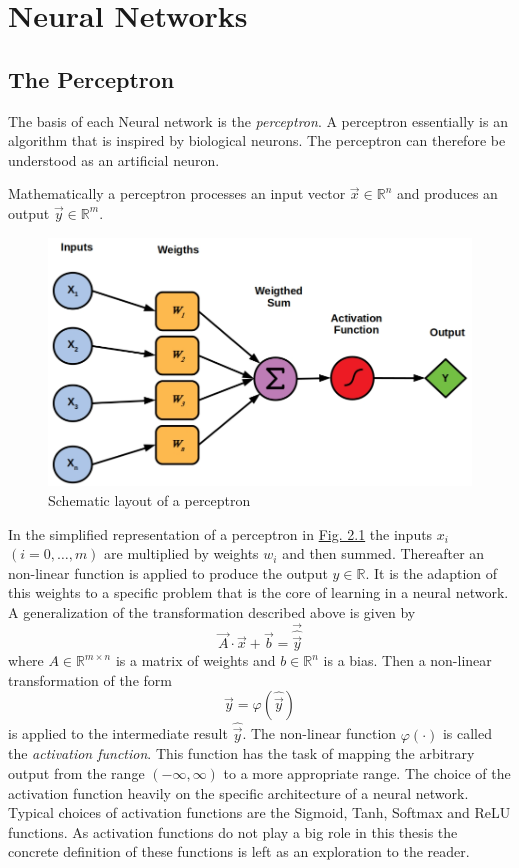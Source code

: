 \section{Neural Networks}
\subsection{The Perceptron}
The basis of each Neural network is the \textit{perceptron}. A perceptron essentially is an algorithm that is inspired by biological neurons. The perceptron can therefore be understood as an artificial neuron.

Mathematically a perceptron processes an input vector $\vec{x}\in\mathbb{R}^n$ and produces an output $\vec{y}\in\mathbb{R}^m$. 
%
\begin{figure} \label{fig:2.1}
    \centering
    \includegraphics[width=.5\textwidth]{Chapters/figures/perceptron.PNG}
    \caption{Schematic layout of a perceptron}
\end{figure}
%
In the simplified representation of a perceptron in \hyperref[fig:2.1]{Fig. 2.1} the inputs $x_i$ $ (i=0,\dots,m)$ are multiplied by weights $w_i$ and then summed. Thereafter an non-linear function is applied to produce the output $y\in\mathbb{R}$. It is the adaption of this weights to a specific problem that is the core of learning in a neural network. A generalization of the transformation described above is given by
%
\begin{equation} \label{equ:2.1}
    \vec{A}\cdot\vec{x}+\vec{b}=\vec{\hat{\vec{y}}}
\end{equation}
%
where $A\in\mathbb{R}^{m\times n}$ is a matrix of weights and $b\in\mathbb{R}^n$ is a bias. Then a non-linear transformation of the form
%
\begin{equation} \label{equ:2.2}
    \vec{y}=\varphi(\hat{\vec{y}})
\end{equation}
%
is applied to the intermediate result $\hat{\vec{y}}$. The non-linear function $\varphi(\cdot)$ is called the \textit{activation function}. This function has the task of mapping the arbitrary output from the range $(-\infty,\infty)$ to a more appropriate range. The choice of the activation function heavily on the specific architecture of a neural network. Typical choices of activation functions are the Sigmoid, Tanh, Softmax and ReLU functions. As activation functions do not play a big role in this thesis the concrete definition of these functions is left as an exploration to the reader.
%
